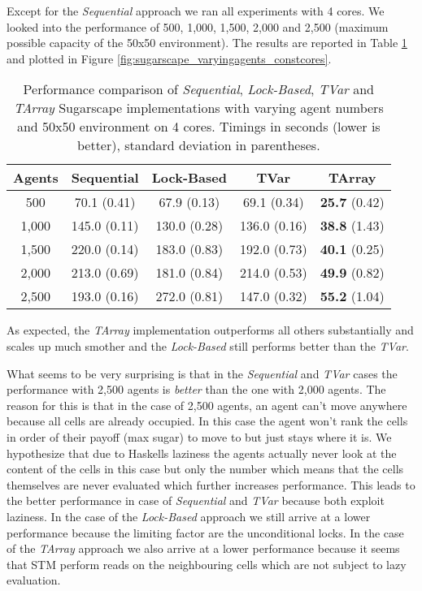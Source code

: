 Except for the \textit{Sequential} approach we ran all experiments with 4 cores. We looked into the performance of 500, 1,000, 1,500, 2,000 and 2,500 (maximum possible capacity of the 50x50 environment). The results are reported in Table \ref{tab:sugarscape_varyingagents_constcores} and plotted in Figure \ref{fig:sugarscape_varyingagents_constcores}.

\begin{table}
	\centering
  	\begin{tabular}{ c || c | c | c | c }
        Agents  & Sequential    & Lock-Based    & TVar          & TArray                \\ \hline \hline 
    	    500     & 70.1 (0.41)   & 67.9 (0.13)   & 69.1 (0.34)   & \textbf{25.7} (0.42)  \\ \hline
   		1,000   & 145.0 (0.11)  & 130.0 (0.28)  & 136.0 (0.16)  & \textbf{38.8} (1.43)  \\ \hline
   		1,500   & 220.0 (0.14)  & 183.0 (0.83)  & 192.0 (0.73)  & \textbf{40.1} (0.25)  \\ \hline
   		2,000   & 213.0 (0.69)  & 181.0 (0.84)  & 214.0 (0.53)  & \textbf{49.9} (0.82)  \\ \hline
   		2,500   & 193.0 (0.16)  & 272.0 (0.81)  & 147.0 (0.32)  & \textbf{55.2} (1.04)  \\ \hline \hline
   	\end{tabular}
  	
  	\caption{Performance comparison of \textit{Sequential}, \textit{Lock-Based}, \textit{TVar} and \textit{TArray} Sugarscape implementations with varying agent numbers and 50x50 environment on 4 cores. Timings in seconds (lower is better), standard deviation in parentheses.}
	\label{tab:sugarscape_varyingagents_constcores}
\end{table}

As expected, the \textit{TArray} implementation outperforms all others substantially and scales up much smother and the \textit{Lock-Based} still performs better than the \textit{TVar}.

What seems to be very surprising is that in the \textit{Sequential} and \textit{TVar} cases the performance with 2,500 agents is \textit{better} than the one with 2,000 agents. The reason for this is that in the case of 2,500 agents, an agent can't move anywhere because all cells are already occupied. In this case the agent won't rank the cells in order of their payoff (max sugar) to move to but just stays where it is. We hypothesize that due to Haskells laziness the agents actually never look at the content of the cells in this case but only the number which means that the cells themselves are never evaluated which further increases performance. This leads to the better performance in case of \textit{Sequential} and \textit{TVar} because both exploit laziness. 
In the case of the \textit{Lock-Based} approach we still arrive at a lower performance because the limiting factor are the unconditional locks. In the case of the \textit{TArray} approach we also arrive at a lower performance because it seems that STM perform reads on the neighbouring cells which are not subject to lazy evaluation.

